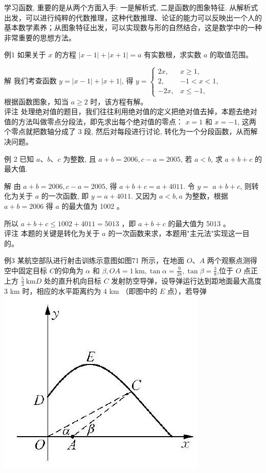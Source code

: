 \documentclass[10pt]{article}
\begin{document}
学习函数, 重要的是从两个方面入手: 一是解析式, 二是函数的图象特征. 从解析式出发，可以进行纯粹的代数推理，这种代数推理、论证的能力可以反映出一个人的基本数学素养；从图象特征出发，可以实现数与形的自然结合，这是数学中的一种非常重要的思想方法。

例1 如果关于 $x$ 的方程 $|x-1|+|x+1|=a$ 有实数根，求实数 $a$ 的取值范围。

解 我们考查函数 $y=|x-1|+|x+1|$, 得 $y= \begin{cases}2 x, & x \geqslant 1, \\ 2, & -1<x<1, \\ -2 x, & x \leqslant-1,\end{cases}$\\
根据函数图象，知当 $a \geqslant 2$ 时，该方程有解。\\
评注 处理绝对值的题目，我们往往利用绝对值的定义把绝对值去掉，本题去绝对值的方法叫做零点分段法，即先求出每个绝对值的零点： $x=1$ 和 $x=-1$, 这两个零点就把数轴分成了 3 段, 然后对每段进行讨论, 转化为一个分段函数，从而解决问题。

例 2 已知 $a 、 b 、 c$ 为整数, 且 $a+b=2006, c-a=2005$, 若 $a<b$, 求 $a+b+c$ 的最大值.

解 由 $a+b=2006, c-a=2005$, 得 $a+b+c=a+4011$. 令 $y=$ $a+b+c$, 则转化为关于 $a$ 的一次函数, 即 $y=a+4011$. 又因为 $a<b, a$ 为整数，根据 $a+b=2006$ 得 $a$ 的最大值为 1002 。

所以 $a+b+c \leqslant 1002+4011=5013$ ，即 $a+b+c$ 的最大值为 5013 。\\
评注 本题的关键是转化为关于 $a$ 的一次函数来求，本题用"主元法"实现这一目的。

例3 某航空部队进行射击训练示意图如图71 所示，在地面 $O 、 A$ 两个观察点测得空中固定目标 $C$的仰角为 $\alpha$ 和 $\beta, O A=1 \mathrm{~km}, \tan \alpha=\frac{9}{28}, \tan \beta=\frac{3}{8}$,位于 $O$ 点正上方 $\frac{5}{3} \mathrm{~km} D$ 处的直升机向目标 $C$ 发射防空导弹，设导弹运行达到距地面最大高度 3 km 时，相应的水平距离约为 4 km （即图中的 $E$ 点），若导弹\\
\includegraphics[max width=\textwidth, center]{2024_10_30_1bf34f7aeb61f11d11d3g-094}
\end{document}
